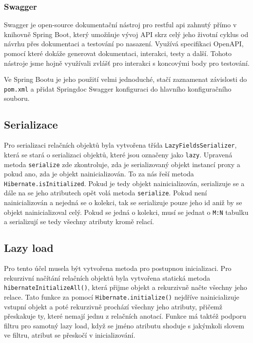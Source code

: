 \subsubsection*{Swagger}\label{sec:impl:swagger}
Swagger je open-source dokumentační nástroj pro \gls{restful api} zahnutý přímo v knihovně Spring Boot, který umožňuje vývoj API skrz celý jeho životní cyklus od návrhu přes dokumentaci a testování po nasazení. Využívá specifikaci OpenAPI, pomocí které dokáže generovat dokumentaci, interakci, testy a další.\cite{swagger:about} Tohoto nástroje jsme hojně využívali zvlášť pro interakci s koncovými body pro testování.

Ve Spring Bootu je jeho použití velmi jednoduché, stačí zaznamenat závislosti do \texttt{pom.xml} a přidat Springdoc Swagger konfiguraci do hlavního konfiguračního souboru.

\subsection{Serializace}\label{sec:impl:serialization} 
Pro serializaci  relačních objektů byla vytvořena třída \texttt{LazyFieldsSerializer}, která se stará o serializaci objektů, které jsou označeny jako \texttt{lazy}.
Upravená metoda \texttt{serialize} zde zkontroluje, zda je serializovaný objekt instancí proxy a pokud ano, zda je objekt nainicializován. To za nás řeší metoda \texttt{Hibernate.isInitialized}. 
Pokud je tedy objekt nainicializován, serializuje se a dále na se jeho atributech opět volá metoda \texttt{serialize}. Pokud není nainicializován a nejedná se o kolekci, tak se serializuje pouze jeho id aniž by se objekt nainicializoval celý.
Pokud se jedná o kolekci, musí se jednat o \texttt{M:N} tabulku a serializují se tedy všechny atributy kromě relací. 


\subsection{Lazy load}\label{sec:impl:lazyload}
Pro tento účel musela být vytvořena metoda pro postupnou inicializaci. Pro rekurzivní načítání relačních objektů byla vytvořena statická metoda \texttt{hibernateInitializeAll()}, která přijme objekt a rekurzivně načte všechny jeho relace.
Tato funkce za pomocí \texttt{Hibernate.initialize()} nejdříve nainicializuje vstupní objekt a poté rekurzivně prochází všechny jeho atributy, přičemž přeskakuje ty, které nemají jednu z relačních anotací. Funkce má taktéž podporu filtru pro samotný lazy load, když se jméno atributu shoduje s jakýmkoli slovem ve filtru, atribut se přeskočí v inicializování.


